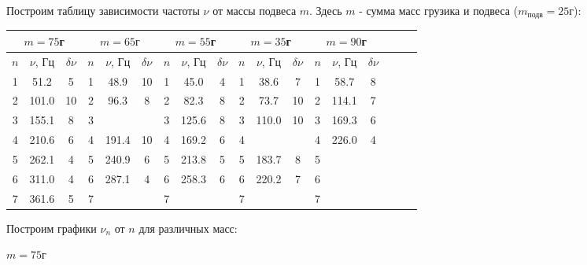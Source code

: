\documentclass[14pt]{article}
\begin{document}
\vspace{1cm}
Построим таблицу зависимости частоты $\nu$ от массы подвеса $m$. Здесь $m$ - сумма масс грузика и подвеса ($m_\text{подв} = 25$г):

\begin{center}
\begin{tabular}{|c|c|c|c|c|c|c|c|c|c|c|c|c|c|c|c|c|c|}
\hline
\multicolumn{3}{|c|}{$m = 75$г}&\multicolumn{3}{|c|}{$m = 65г$}&\multicolumn{3}{|c|}{$m = 55$г}&\multicolumn{3}{|c|}{$m = 35$г}&\multicolumn{3}{|c|}{$m = 90$г}\\
\hline
$n$	&$\nu$, Гц	&$\delta\nu$&$n$ &$\nu$, Гц&$\delta\nu$&	$n$	&$\nu$, Гц &$\delta\nu$&$n$	&$\nu$, Гц&$\delta\nu$&	$n$	&$\nu$, Гц&$\delta\nu$\\
\hline
1	&51.2		&5			& 1	  &48.9	  	&10		  	&	1	&45.0		&4		  	&1	&38.6	  &7	  	  &	1	&58.7		&8			\\
\hline
2	&101.0		&10			& 2	  &96.3		&8		  	&	2	&82.3		&8		  	&2	&73.7	  &10	  	  &	2	&114.1		&7			\\
\hline
3	&155.1		&8			& 3   &			&		  	&	3	&125.6		&8		  	&3	&110.0	  &10	  	  &	3	&169.3		&6			\\
\hline
4	&210.6		&6			& 4	  &191.4	&10		  	&	4	&169.2		&6		  	&4	&		  &		  	  &	4	&226.0		&4			\\
\hline
5	&262.1		&4			& 5	  &240.9	&6		  	&	5	&213.8		&5		  	&5	&183.7	  &8	  	  &	5	&			&			\\
\hline
6	&311.0		&4			& 6   &287.1	&4		  	&	6	&258.3		&6		  	&6	&220.2	  &7	  	  &	6	&			&			\\
\hline
7	&361.6		&5			& 7   &			&		  	&	7	&			&			&7	&		  &	  	  	  &	7	&			&			\\
\hline
\end{tabular}
\end{center}

Построим графики $\nu_n$ от $n$ для различных масс:

\vspace{1cm}
\hspace{2cm}$m = 75$г
\begin{flushleft}
\end{flushleft}
\end{document}
